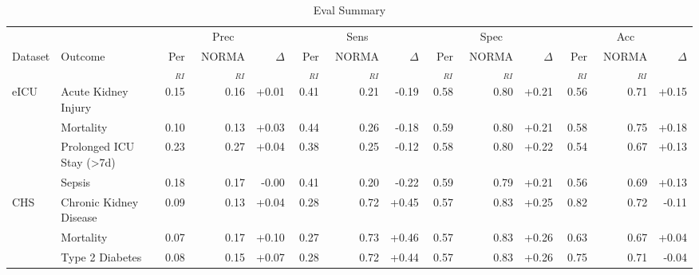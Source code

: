 \begin{table}[ht]
\centering
\footnotesize
\begin{tabular}{llrrrrrrrrrrrr}
\toprule
 &  & \multicolumn{3}{c}{Prec} & \multicolumn{3}{c}{Sens} & \multicolumn{3}{c}{Spec} & \multicolumn{3}{c}{Acc} \\
\cmidrule(lr){3-5} \cmidrule(lr){6-8} \cmidrule(lr){9-11} \cmidrule(lr){12-14}
Dataset & Outcome & Per$_{RI}$ & NORMA$_{RI}$ & $\Delta$ & Per$_{RI}$ & NORMA$_{RI}$ & $\Delta$ & Per$_{RI}$ & NORMA$_{RI}$ & $\Delta$ & Per$_{RI}$ & NORMA$_{RI}$ & $\Delta$ \\
\midrule
eICU & Acute Kidney Injury & 0.15 & 0.16 & +0.01 & 0.41 & 0.21 & -0.19 & 0.58 & 0.80 & +0.21 & 0.56 & 0.71 & +0.15 \\
 & Mortality & 0.10 & 0.13 & +0.03 & 0.44 & 0.26 & -0.18 & 0.59 & 0.80 & +0.21 & 0.58 & 0.75 & +0.18 \\
 & Prolonged ICU Stay (>7d) & 0.23 & 0.27 & +0.04 & 0.38 & 0.25 & -0.12 & 0.58 & 0.80 & +0.22 & 0.54 & 0.67 & +0.13 \\
 & Sepsis & 0.18 & 0.17 & -0.00 & 0.41 & 0.20 & -0.22 & 0.59 & 0.79 & +0.21 & 0.56 & 0.69 & +0.13 \\
CHS & Chronic Kidney Disease & 0.09 & 0.13 & +0.04 & 0.28 & 0.72 & +0.45 & 0.57 & 0.83 & +0.25 & 0.82 & 0.72 & -0.11 \\
 & Mortality & 0.07 & 0.17 & +0.10 & 0.27 & 0.73 & +0.46 & 0.57 & 0.83 & +0.26 & 0.63 & 0.67 & +0.04 \\
 & Type 2 Diabetes & 0.08 & 0.15 & +0.07 & 0.28 & 0.72 & +0.44 & 0.57 & 0.83 & +0.26 & 0.75 & 0.71 & -0.04 \\
\bottomrule
\end{tabular}
\caption{Eval Summary}
\label{tab:eval_summary}
\end{table}